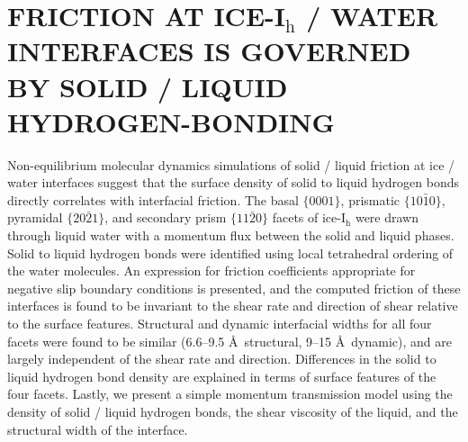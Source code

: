 

\chapter{FRICTION AT ICE-I$_\mathrm{h}$ / WATER INTERFACES IS GOVERNED
  BY SOLID / LIQUID HYDROGEN-BONDING}


Non-equilibrium molecular dynamics simulations of solid / liquid
friction at ice / water interfaces suggest that the surface density
of solid to liquid hydrogen bonds directly correlates with
interfacial friction.  The basal $\{0001\}$, prismatic
$\{10\bar{1}0\}$, pyramidal $\{20\bar{2}1\}$, and secondary prism
$\{11\bar{2}0\}$ facets of ice-I$_\mathrm{h}$ were drawn through
liquid water with a momentum flux between the solid and liquid
phases. Solid to liquid hydrogen bonds were identified using local
tetrahedral ordering of the water molecules. An expression for
friction coefficients appropriate for negative slip boundary
conditions is presented, and the computed friction of these
interfaces is found to be invariant to the shear rate and direction
of shear relative to the surface features. Structural and dynamic
interfacial widths for all four facets were found to be similar
(6.6--9.5 \AA~structural, 9--15 \AA~dynamic), and are largely
independent of the shear rate and direction. Differences in the
solid to liquid hydrogen bond density are explained in terms of
surface features of the four facets. Lastly, we present a simple
momentum transmission model using the density of solid / liquid
hydrogen bonds, the shear viscosity of the liquid, and the
structural width of the interface.



